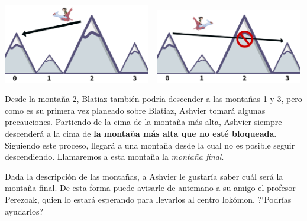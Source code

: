 \documentclass{oci}
\begin{document}
\begin{problemDescription}
\begin{center}
\includegraphics[width=0.48\textwidth]{allowed.png}
~
\includegraphics[width=0.48\textwidth]{disallowed.png}
\end{center}

Desde la montaña 2, Blatiaz también podría descender a las montañas 1 y 3, pero
como es su primera vez planeado sobre Blatiaz, Ashvier tomará algunas precauciones.
Partiendo de la cima de la montaña más alta, Ashvier siempre descenderá a la cima de
{\bf la montaña más alta que no esté bloqueada}.
Siguiendo este proceso, llegará a una montaña desde la cual no es posible seguir descendiendo.
Llamaremos a esta montaña la \emph{montaña final}.

Dada la descripción de las montañas, a Ashvier le gustaría saber cuál será la
montaña final.
De esta forma puede avisarle de antemano a su amigo el profesor Perezoak, quien lo estará
esperando para llevarlos al centro lokómon.
?`Podrías ayudarlos?




\end{problemDescription}
\end{document}

